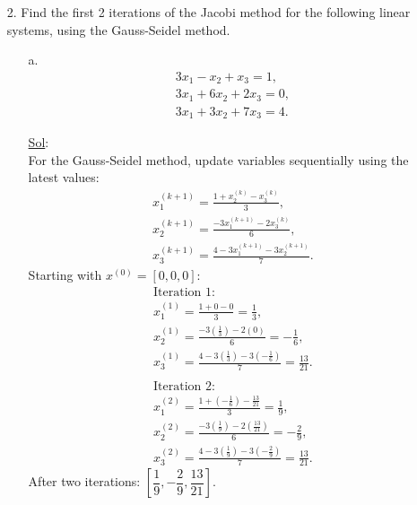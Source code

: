 \begin{enumerate}
  \item[2.] Find the first 2 iterations of the Jacobi method for the
    following linear systems, using the Gauss-Seidel method.
    \begin{enumerate}
      \item[a.] \[
          \begin{array}{l}
            3x_1 - x_2 + x_3 = 1, \\
            3x_1 + 6x_2 + 2x_3 = 0, \\
            3x_1 + 3x_2 + 7x_3 = 4.
          \end{array}
        \]

        \underline{Sol}:\\
        For the Gauss-Seidel method, update variables sequentially
        using the latest values:
        \[
          \begin{array}{l}
            x_1^{(k+1)} = \frac{1 + x_2^{(k)} - x_3^{(k)}}{3}, \\
            x_2^{(k+1)} = \frac{-3x_1^{(k+1)} - 2x_3^{(k)}}{6}, \\
            x_3^{(k+1)} = \frac{4 - 3x_1^{(k+1)} - 3x_2^{(k+1)}}{7}.
          \end{array}
        \]
        Starting with \(x^{(0)} = [0, 0, 0]\):
        \[
          \begin{array}{l}
            \text{Iteration 1:} \\
            x_1^{(1)} = \frac{1 + 0 - 0}{3} = \frac{1}{3}, \\
            x_2^{(1)} = \frac{-3\left(\frac{1}{3}\right) - 2(0)}{6} =
            -\frac{1}{6}, \\
            x_3^{(1)} = \frac{4 - 3\left(\frac{1}{3}\right) -
            3\left(-\frac{1}{6}\right)}{7} = \frac{13}{21}. \\
            \\
            \text{Iteration 2:} \\
            x_1^{(2)} = \frac{1 + \left(-\frac{1}{6}\right) -
            \frac{13}{21}}{3} = \frac{1}{9}, \\
            x_2^{(2)} = \frac{-3\left(\frac{1}{9}\right) -
            2\left(\frac{13}{21}\right)}{6} = -\frac{2}{9}, \\
            x_3^{(2)} = \frac{4 - 3\left(\frac{1}{9}\right) -
            3\left(-\frac{2}{9}\right)}{7} = \frac{13}{21}.
          \end{array}
        \]
        After two iterations: \(\boxed{\left[ \dfrac{1}{9},
        -\dfrac{2}{9}, \dfrac{13}{21} \right]}\).
    \end{enumerate}


\end{enumerate}

